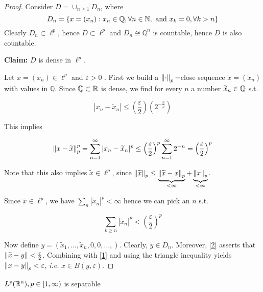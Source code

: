 \documentclass{article}
\begin{document}
\begin{proof}
	Consider \(D = \cup_{n\geq 1} D_n\), where  
	\[ D_n = \{x=(x_n): x_n \in \mathbb{Q}, \forall n \in \mathbb{N}, \ \text{and} \ x_k=0, \forall k >n\}\]
 Clearly $D_n \subset \ell^p$, hence $D\subset \ell^p$ and $D_n \cong \mathbb{Q}^n$ is countable, hence $D$ is also countable.   

\textbf{Claim:} $D$ is dense in $\ell^p$.  

Let $x = (x_n) \in \ell^p$ and $\varepsilon >0$ . First we build a $\left\|{\cdot}\right\|_p-$close sequence $\widetilde{x}=(\widetilde{x}_n)$ with values in $\mathbb{Q}$. Since $\mathbb{Q} \subset \mathbb{R}$ is dense, we find for every $n$ a number $\widetilde{x}_n \in \mathbb{Q}$ s.t.  

$$
|x_n-\widetilde{x}_n| \leq \left(\frac{\varepsilon}{2}\right) (2^{-\frac{n}{p}})
$$  

This implies  

\begin{equation}
\label{1}
    \left\|{x-\widetilde{x}}\right\|_p^p = \sum_{n=1}^{\infty} |x_n-\widetilde{x}_n|^p \leq \left(\frac{\varepsilon}{2}\right)^p \sum_{n=1}^{\infty} 2^{-n}=\left(\frac{\varepsilon}{2}\right)^p
\end{equation}

Note that this also implies $\widetilde{x} \in \ell^p$, since $\left\|{\widetilde{x}}\right\|_p \leq \underbrace{\left\|{\widetilde{x}-x}\right\|_p}_{<\infty}+\underbrace{\left\|{x}\right\|_p}_{<\infty}$.  

Since $\widetilde{x} \in \ell^p$, we have $\sum_n |\widetilde{x}_n|^p < \infty$ hence we can pick an $n$ s.t.  

\begin{equation}
\label{2}
    \sum_{k\geq n} |\widetilde{x}_n|^p < \left(\frac{\varepsilon}{2}\right)^p
\end{equation}

Now define $y = (\widetilde{x}_1, \ldots, \widetilde{x}_n, 0, 0, \ldots,)$. Clearly, $y \in D_n$. Moreover, \cref{2} asserts that $\left\|{\widetilde{x}-y}\right\| < \frac{\varepsilon}{2}$. Combining with \cref{1} and using the triangle inequality yields $\left\|{x-y}\right\|_p < \varepsilon$, \textit{i.e.} $x\in B(y, \varepsilon)$.  
\end{proof}  

\begin{proposition}
    $L^p(\mathbb{R}^n), p \in [1, \infty)$ is separable
\end{proposition}  
\end{document}
